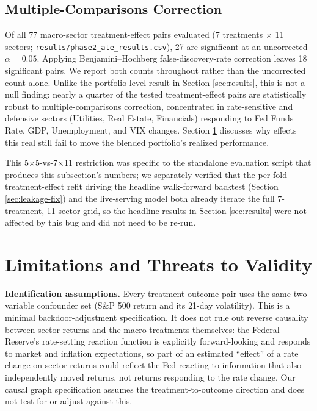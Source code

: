 \documentclass[10pt,twocolumn]{article}
\begin{document}
\subsection{Multiple-Comparisons Correction}
Of all 77 macro-sector treatment-effect pairs evaluated (7 treatments
$\times$ 11 sectors; \texttt{results/phase2\_ate\_results.csv}), 27 are
significant at an uncorrected $\alpha=0.05$. Applying
Benjamini--Hochberg false-discovery-rate correction
\citep{benjamini1995controlling} leaves 18 significant pairs. We report
both counts throughout rather than the uncorrected count alone. Unlike
the portfolio-level result in Section \ref{sec:results}, this is not a
null finding: nearly a quarter of the tested treatment-effect pairs are
statistically robust to multiple-comparisons correction, concentrated in
rate-sensitive and defensive sectors (Utilities, Real Estate,
Financials) responding to Fed Funds Rate, GDP, Unemployment, and VIX
changes. Section \ref{sec:limitations} discusses why effects this real
still fail to move the blended portfolio's realized performance.

This 5$\times$5-vs-7$\times$11 restriction was specific to the standalone
evaluation script that produces this subsection's numbers; we separately
verified that the per-fold treatment-effect refit driving the headline
walk-forward backtest (Section \ref{sec:leakage-fix}) and the live-serving
model both already iterate the full 7-treatment, 11-sector grid, so the
headline results in Section \ref{sec:results} were not affected by this
bug and did not need to be re-run.

\section{Limitations and Threats to Validity}
\label{sec:limitations}

\textbf{Identification assumptions.} Every treatment-outcome pair uses
the same two-variable confounder set (S\&P 500 return and its 21-day
volatility). This is a minimal backdoor-adjustment specification. It
does not rule out reverse causality between sector returns and the
macro treatments themselves: the Federal Reserve's rate-setting reaction
function is explicitly forward-looking and responds to market and
inflation expectations, so part of an estimated ``effect'' of a rate
change on sector returns could reflect the Fed reacting to information
that also independently moved returns, not returns responding to the
rate change. Our causal graph specification assumes the treatment-to-outcome
direction and does not test for or adjust against this.
\end{document}
